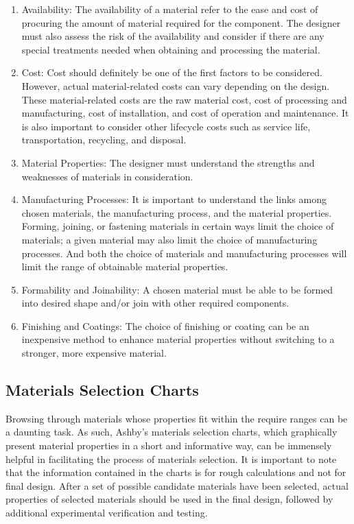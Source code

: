 \documentclass[a4paper,openany,12pt]{book}
\begin{document}
\begin{enumerate}
\item Availability: The availability of a material refer to the ease and
cost of procuring the amount of material required for the component.
The designer must also assess the risk of the availability and
consider if there are any special treatments needed when obtaining
and processing the material.

\item Cost: Cost should definitely be one of the first factors to be
considered. However, actual material-related costs can vary depending
on the design. These material-related costs are the raw material
cost, cost of processing and manufacturing, cost of installation, and
cost of operation and maintenance. It is also important to consider
other lifecycle costs such as service life, transportation,
recycling, and disposal.

\item Material Properties: The designer must understand the strengths and
weaknesses of materials in consideration.

\item Manufacturing Processes: It is important to understand the links
among chosen materials, the manufacturing process, and the material
properties. Forming, joining, or fastening materials in certain ways
limit the choice of materials; a given material may also limit the
choice of manufacturing processes. And both the choice of materials
and manufacturing processes will limit the range of obtainable
material properties.

\item Formability and Joinability: A chosen material must be able to be
formed into desired shape and/or join with other required components.

\item Finishing and Coatings: The choice of finishing or coating can be an
inexpensive method to enhance material properties without switching
to a stronger, more expensive material.
\end{enumerate}

\subsection{Materials Selection Charts}
\label{materials-selection-charts}
Browsing through materials whose properties fit within the require
ranges can be a daunting task. As such, Ashby's materials selection
charts, which graphically present material properties in a short and
informative way, can be immensely helpful in facilitating the process of
materials selection. It is important to note that the information
contained in the charts is for rough calculations and not for final
design. After a set of possible candidate materials have been selected,
actual properties of selected materials should be used in the final
design, followed by additional experimental verification and testing.
\end{document}
